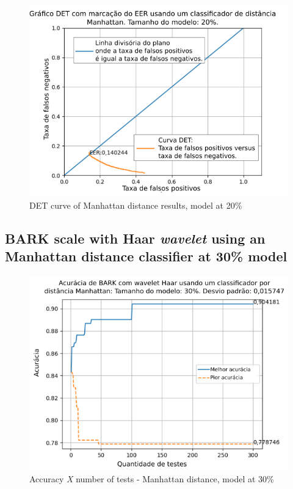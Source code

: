 \begin{figure}[!h]
	\centering
	\includegraphics[width=.9\linewidth]{images/results/det/DET_for_classifier_Manhattan_20}
	\caption{DET curve of Manhattan distance results, model at 20\%}
	\label{fig:detforclassifiermanhattan20}
\end{figure}

\subsection{BARK scale with Haar \textit{wavelet} using an Manhattan distance classifier at 30\% model}



\begin{figure}[ht]
	\centering
	\includegraphics[width=\linewidth]{images/results/confusionMatrices/classifier_Manhattan_30.png}
	\caption{Accuracy \textit{X} number of tests - Manhattan distance, model at 30\%}
	\label{fig:classifiermanhattan30}
\end{figure}

